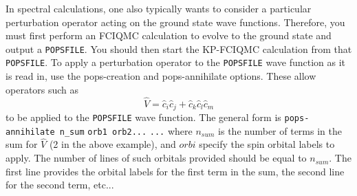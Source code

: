 \documentclass[a4paper,notitlepage,dvipsnames]{scrreprt}
\let\code\lstinline
\begin{document}
    In spectral calculations, one also typically wants to consider a particular
    perturbation operator acting on the ground state wave functions. Therefore,
    you must first perform an FCIQMC calculation to evolve to the ground state
    and output a \code{POPSFILE}. You should then start the KP-FCIQMC
    calculation from that \code{POPSFILE}. To apply a perturbation operator to
    the \code{POPSFILE} wave function as it is read in, use the pops-creation
    and pops-annihilate options. These allow operators such as
    \begin{equation}
        \hat{V} = \hat{c}_i \hat{c}_j + \hat{c}_k \hat{c}_l \hat{c}_m
    \end{equation}
    to be applied to the \code{POPSFILE} wave function. The general form is
    \code{pops-annihilate n_sum}
    \code{orb1 orb2...}
    \code{...}
    where $n_{sum}$ is the number of terms in the sum for $\hat{V}$ (2 in the
    above example), and $orbi$ specify the spin orbital labels to apply. The
    number of lines of such orbitals provided should be equal to $n_{sum}$. The
    first line provides the orbital labels for the first term in the sum, the
    second line for the second term, etc...
\end{document}
